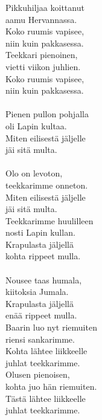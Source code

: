 
Pikkuhiljaa koittanut \\ aamu Hervannassa. \\ Koko ruumis vapisee, \\ niin kuin pakkasessa. \\ Teekkari pienoinen, \\ vietti viikon juhlien. \\ Koko ruumis vapisee, \\ niin kuin pakkasessa. \\ \hspace{10mm} \\ Pienen pullon pohjalla \\ oli Lapin kultaa. \\ Miten eilisestä jäljelle \\ jäi sitä multa. \\ \hspace{10mm} \\ Olo on levoton, \\ teekkarimme onneton. \\ Miten eilisestä jäljelle \\ jäi sitä multa. \\ Teekkarimme huulilleen \\ nosti Lapin kullan. \\ Krapulasta jäljellä \\ kohta rippeet mulla. \\ \hspace{10mm} \\ Nousee taas humala, \\ kiitoksia Jumala. \\ Krapulasta jäljellä \\ enää rippeet mulla. \\ Baarin luo nyt riemuiten \\ riensi sankarimme. \\ Kohta lähtee liikkeelle \\ juhlat teekkarimme. \\ Olusen pienoisen, \\ kohta juo hän riemuiten. \\ Tästä lähtee liikkeelle \\ juhlat teekkarimme.